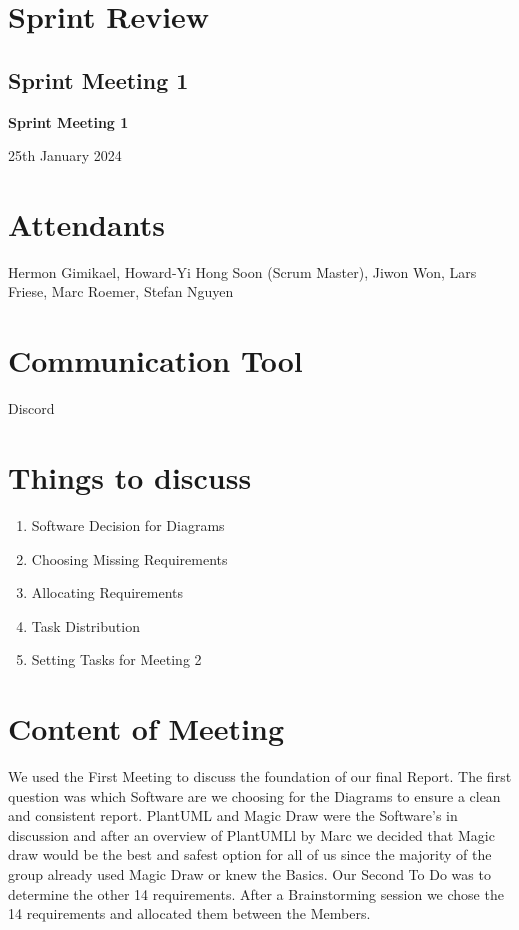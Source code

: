 \documentclass{article}
\begin{document}
\clearpage


\section{Sprint Review}
\subsection{Sprint Meeting 1}
\begin{center}
    {\Large \textbf{Sprint Meeting 1}}
    
    \vspace{0.5cm}
    
    {\large 25th January 2024}
\end{center}

\section*{Attendants}
Hermon Gimikael, Howard-Yi Hong Soon (Scrum Master), Jiwon Won, Lars Friese, Marc Roemer, Stefan Nguyen

\section*{Communication Tool}
Discord

\section*{Things to discuss}
\begin{enumerate}
    \item Software Decision for Diagrams
    \item Choosing Missing Requirements
    \item Allocating Requirements
    \item Task Distribution
    \item Setting Tasks for Meeting 2
\end{enumerate}

\section*{Content of Meeting}
We used the First Meeting to discuss the foundation of our final Report. The first question was which Software are we choosing for the Diagrams to ensure a clean and consistent report. PlantUML and Magic Draw were the Software’s in discussion and after an overview of PlantUMLl by Marc we decided that Magic draw would be the best and safest option for all of us since the majority of the group already used Magic Draw or knew the Basics. Our Second To Do was to determine the other 14 requirements. After a Brainstorming session we chose the 14 requirements and allocated them between the Members.
\end{document}
